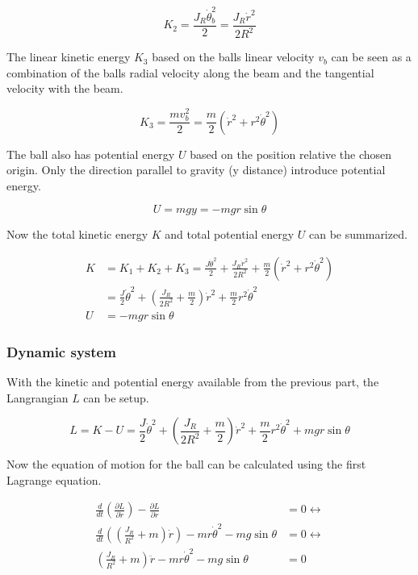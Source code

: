 \documentclass[a4paper, titlepage]{article}
\begin{document}
\begin{equation}
K_2 = \frac{J_R\dot{\theta}_b^2}{2} = \frac{J_R\dot{r}^2}{2R^2}
\end{equation}

The linear kinetic energy $K_3$ based on the balls linear velocity $v_b$ can be seen as a combination of the balls radial velocity along the beam and the tangential velocity with the beam.

\begin{equation}
K_3 = \frac{mv_b^2}{2} = \frac{m}{2}(\dot{r}^2 + r^2\dot{\theta}^2)
\end{equation}

The ball also has potential energy $U$ based on the position relative the chosen origin.
Only the direction parallel to gravity (y distance) introduce potential energy.

\begin{equation}
U = mgy = -mgr\sin{\theta}
\end{equation}

Now the total kinetic energy $K$ and total potential energy $U$ can be summarized.

\begin{equation}
\begin{split}
K &= K_1 + K_2 + K_3 = 
\frac{J\dot{\theta}^2}{2} + 
\frac{J_R\dot{r}^2}{2R^2} + 
\frac{m}{2}(\dot{r}^2 + r^2\dot{\theta}^2) \\
&= \frac{J}{2}\dot{\theta}^2 + 
(\frac{J_R}{2R^2} + \frac{m}{2})\dot{r}^2 + 
\frac{m}{2}r^2\dot{\theta}^2 \\
U &= -mgr\sin{\theta}
\end{split}
\end{equation}

\subsubsection{Dynamic system}
With the kinetic and potential energy available from the previous part, the Langrangian $L$ can be setup.

\begin{equation}
L = K - U = 
\frac{J}{2}\dot{\theta}^2 + 
(\frac{J_R}{2R^2} + \frac{m}{2})\dot{r}^2 + 
\frac{m}{2}r^2\dot{\theta}^2 +
mgr\sin{\theta}
\end{equation}

Now the equation of motion for the ball can be calculated using the first Lagrange equation.

\begin{equation}
\begin{split}
\frac{d}{dt}\left(\frac{\partial L}{\partial \dot{r}}\right) - \frac{\partial L}{\partial r} &= 0 \leftrightarrow \\
\frac{d}{dt}\left(\left(\frac{J_R}{R^2} + m\right)\dot{r}\right) - mr\dot{\theta}^2 - mg\sin{\theta} &= 0 \leftrightarrow \\
\left(\frac{J_R}{R^2} + m\right)\ddot{r} - mr\dot{\theta}^2 - mg\sin{\theta} &= 0
\label{equ:ballDiff}
\end{split}
\end{equation}
\end{document}
